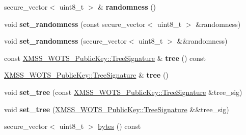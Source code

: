 \begin{DoxyCompactItemize}
\item 
\mbox{\label{class_botan_1_1_x_m_s_s___signature_a8e14916093799b2d33d271d926a41676}} 
secure\+\_\+vector$<$ uint8\+\_\+t $>$ \& {\bfseries randomness} ()
\item 
\mbox{\label{class_botan_1_1_x_m_s_s___signature_a9f0217b21e619787b96efc5f2c3ca675}} 
void {\bfseries set\+\_\+randomness} (const secure\+\_\+vector$<$ uint8\+\_\+t $>$ \&randomness)
\item 
\mbox{\label{class_botan_1_1_x_m_s_s___signature_ad814346902d1e578bd4e40e6344c1a69}} 
void {\bfseries set\+\_\+randomness} (secure\+\_\+vector$<$ uint8\+\_\+t $>$ \&\&randomness)
\item 
\mbox{\label{class_botan_1_1_x_m_s_s___signature_ad59393a70803a6ff83237c545f2db305}} 
const \mbox{\hyperlink{class_botan_1_1_x_m_s_s___w_o_t_s___public_key_1_1_tree_signature}{X\+M\+S\+S\+\_\+\+W\+O\+T\+S\+\_\+\+Public\+Key\+::\+Tree\+Signature}} \& {\bfseries tree} () const
\item 
\mbox{\label{class_botan_1_1_x_m_s_s___signature_a66d3e9b7faa39b3513f395eb7282fe40}} 
\mbox{\hyperlink{class_botan_1_1_x_m_s_s___w_o_t_s___public_key_1_1_tree_signature}{X\+M\+S\+S\+\_\+\+W\+O\+T\+S\+\_\+\+Public\+Key\+::\+Tree\+Signature}} \& {\bfseries tree} ()
\item 
\mbox{\label{class_botan_1_1_x_m_s_s___signature_a3c528cdd5c5596c2923b34bfde279eba}} 
void {\bfseries set\+\_\+tree} (const \mbox{\hyperlink{class_botan_1_1_x_m_s_s___w_o_t_s___public_key_1_1_tree_signature}{X\+M\+S\+S\+\_\+\+W\+O\+T\+S\+\_\+\+Public\+Key\+::\+Tree\+Signature}} \&tree\+\_\+sig)
\item 
\mbox{\label{class_botan_1_1_x_m_s_s___signature_aab02e4a2af6c70e26493301b954c202d}} 
void {\bfseries set\+\_\+tree} (\mbox{\hyperlink{class_botan_1_1_x_m_s_s___w_o_t_s___public_key_1_1_tree_signature}{X\+M\+S\+S\+\_\+\+W\+O\+T\+S\+\_\+\+Public\+Key\+::\+Tree\+Signature}} \&\&tree\+\_\+sig)
\item 
secure\+\_\+vector$<$ uint8\+\_\+t $>$ \mbox{\hyperlink{class_botan_1_1_x_m_s_s___signature_ab3e591e64d2988865b58ea7885258cf6}{bytes}} () const
\end{DoxyCompactItemize}


